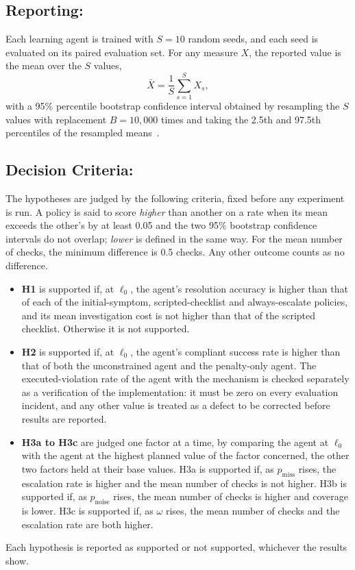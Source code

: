 \subsection{Reporting:}

Each learning agent is trained with $S = 10$ random seeds, and each seed is evaluated on its paired evaluation set. For any measure $X$, the reported value is the mean over the $S$ values,
\begin{equation}
\bar{X} = \frac{1}{S}\sum_{s=1}^{S} X_s,
\end{equation}
with a 95\% percentile bootstrap confidence interval obtained by resampling the $S$ values with replacement $B = 10{,}000$ times and taking the 2.5th and 97.5th percentiles of the resampled means~\cite{agarwal2021}.

\subsection{Decision Criteria:}
\label{sec:criteria}

The hypotheses are judged by the following criteria, fixed before any experiment is run. A policy is said to score \emph{higher} than another on a rate when its mean exceeds the other's by at least 0.05 and the two 95\% bootstrap confidence intervals do not overlap; \emph{lower} is defined in the same way. For the mean number of checks, the minimum difference is 0.5 checks. Any other outcome counts as no difference.
\begin{itemize}
\item \textbf{H1} is supported if, at $\ell_0$, the agent's resolution accuracy is higher than that of each of the initial-symptom, scripted-checklist and always-escalate policies, and its mean investigation cost is not higher than that of the scripted checklist. Otherwise it is not supported.
\item \textbf{H2} is supported if, at $\ell_0$, the agent's compliant success rate is higher than that of both the unconstrained agent and the penalty-only agent. The executed-violation rate of the agent with the mechanism is checked separately as a verification of the implementation: it must be zero on every evaluation incident, and any other value is treated as a defect to be corrected before results are reported.
\item \textbf{H3a to H3c} are judged one factor at a time, by comparing the agent at $\ell_0$ with the agent at the highest planned value of the factor concerned, the other two factors held at their base values. H3a is supported if, as $p_{\text{miss}}$ rises, the escalation rate is higher and the mean number of checks is not higher. H3b is supported if, as $p_{\text{noise}}$ rises, the mean number of checks is higher and coverage is lower. H3c is supported if, as $\omega$ rises, the mean number of checks and the escalation rate are both higher.
\end{itemize}
Each hypothesis is reported as supported or not supported, whichever the results show.

